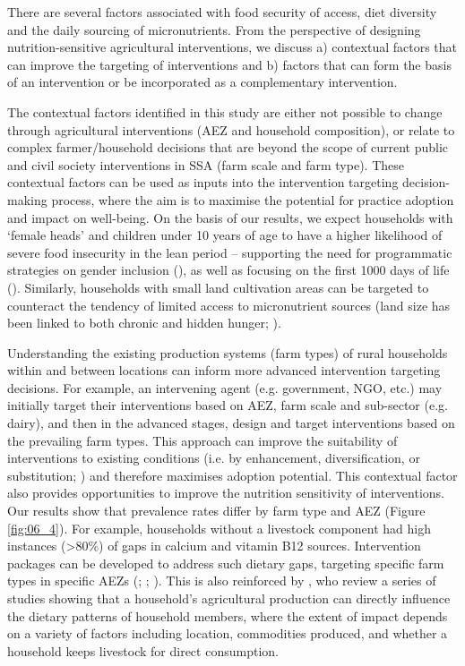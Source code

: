 There are several factors associated with food security of access, diet diversity and the daily sourcing of micronutrients. From the perspective of designing nutrition-sensitive agricultural interventions, we discuss a) contextual factors that can improve the targeting of interventions and b) factors that can form the basis of an intervention or be incorporated as a complementary intervention.

The contextual factors identified in this study are either not possible to change through agricultural interventions (AEZ and household composition), or relate to complex farmer/household decisions that are beyond the scope of current public and civil society interventions in SSA (farm scale and farm type). These contextual factors can be used as inputs into the intervention targeting decision-making process, where the aim is to maximise the potential for practice adoption and impact on well-being. On the basis of our results, we expect households with `female heads' and children under 10 years of age to have a higher likelihood of severe food insecurity in the lean period -- supporting the need for programmatic strategies on gender inclusion (\citealp{Mason2015}), as well as focusing on the first 1000 days of life (\citealp{DePee2017}). Similarly, households with small land cultivation areas can be targeted to counteract the tendency of limited access to micronutrient sources (land size has been linked to both chronic and hidden hunger; \citealp{Godecke2018}).

Understanding the existing production systems (farm types) of rural households within and between locations can inform more advanced intervention targeting decisions. For example, an intervening agent (e.g. government, NGO, etc.) may initially target their interventions based on AEZ, farm scale and sub-sector (e.g. dairy), and then in the advanced stages, design and target interventions based on the prevailing farm types. This approach can improve the suitability of interventions to existing conditions (i.e. by enhancement, diversification, or substitution; \citealp{Fiorella2016}) and therefore maximises adoption potential. This contextual factor also provides opportunities to improve the nutrition sensitivity of interventions. Our results show that prevalence rates differ by farm type and AEZ (Figure \ref{fig:06_4}). For example, households without a livestock component had high instances ({\textgreater}80\%) of gaps in calcium and vitamin B12 sources. Intervention packages can be developed to address such dietary gaps, targeting specific farm types in specific AEZs (\citealp{Hetherington2017}; \citealp{Mulmi2017}; \citealp{Hoddinott2012}). This is also reinforced by \citet{Carletto2015}, who review a series of studies showing that a household's agricultural production can directly influence the dietary patterns of household members, where the extent of impact depends on a variety of factors including location, commodities produced, and whether a household keeps livestock for direct consumption.

